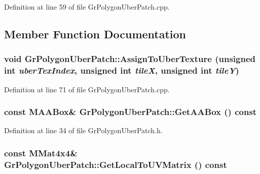 Definition at line 59 of file GrPolygonUberPatch.cpp.

\subsection{Member Function Documentation}
\hypertarget{class_gr_polygon_uber_patch_8504312de783f8dfe605932337209cd9}{
\subsubsection[{AssignToUberTexture}]{\setlength{\rightskip}{0pt plus 5cm}void GrPolygonUberPatch::AssignToUberTexture (unsigned int {\em uberTexIndex}, \/  unsigned int {\em tileX}, \/  unsigned int {\em tileY})}}
\label{class_gr_polygon_uber_patch_8504312de783f8dfe605932337209cd9}




Definition at line 71 of file GrPolygonUberPatch.cpp.\hypertarget{class_gr_polygon_uber_patch_5dce15b73ce4d3df04e23a0ea2a168c8}{
\subsubsection[{GetAABox}]{\setlength{\rightskip}{0pt plus 5cm}const {\bf MAABox}\& GrPolygonUberPatch::GetAABox () const}}
\label{class_gr_polygon_uber_patch_5dce15b73ce4d3df04e23a0ea2a168c8}




Definition at line 34 of file GrPolygonUberPatch.h.\hypertarget{class_gr_polygon_uber_patch_a2904f797da76512d80ede9386a0eadb}{
\subsubsection[{GetLocalToUVMatrix}]{\setlength{\rightskip}{0pt plus 5cm}const {\bf MMat4x4}\& GrPolygonUberPatch::GetLocalToUVMatrix () const}}
\label{class_gr_polygon_uber_patch_a2904f797da76512d80ede9386a0eadb}




